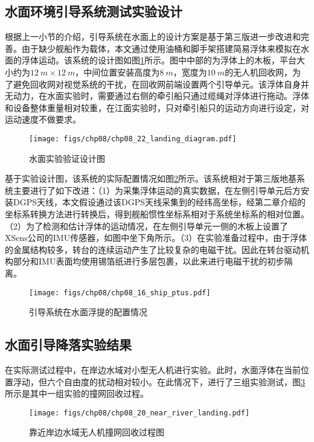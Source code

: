 \subsection{水面环境引导系统测试实验设计}
根据上一小节的介绍，引导系统在水面上的设计方案是基于第三版进一步改进和完善。由于缺少舰船作为载体，本文通过使用油桶和脚手架搭建简易浮体来模拟在水面的浮体运动。该系统的设计图如图\ref{fig:chp08_22_landing_diagram}所示。图中中部的为浮体上的木板，平台大小约为$12\ m\times 12\ m$，中间位置安装高度为$8\ m$，宽度为$10\ m$的无人机回收网，为了避免回收网对视觉系统的干扰，在回收网前端设置两个引导单元。该浮体自身并无动力，在水面实验时，需要通过右侧的牵引船只通过缆绳对浮体进行拖动。浮体和设备整体重量相对较重，在江面实验时，只对牵引船只的运动方向进行设定，对运动速度不做要求。

\begin{figure}[!th]
	\centering
	\texttt{[image: figs/chp08/chp08\_22\_landing\_diagram.pdf]}	
	\caption{水面实验验证设计图}
	\label{fig:chp08_22_landing_diagram}
\end{figure}

基于实验设计图，该系统的实际配置情况如图\ref{fig:chp08_16_ship_ptus}所示。该系统相对于第三版地基系统主要进行了如下改进：（1）为采集浮体运动的真实数据，在左侧引导单元后方安装DGPS天线，本文假设通过该DGPS天线采集到的经纬高坐标，经第二章介绍的坐标系转换方法进行转换后，得到舰船惯性坐标系相对于系统坐标系的相对位置。（2）为了检测和估计浮体的运动情况，在左侧引导单元一侧的木板上设置了XSens公司的IMU传感器，如图中坐下角所示。（3）在实验准备过程中，由于浮体的金属结构较多，转台的连续运动产生了比较复杂的电磁干扰。因此在转台驱动机构部分和IMU表面均使用锡箔纸进行多层包裹，以此来进行电磁干扰的初步隔离。

\begin{figure}[!ht]
	\centering
	\texttt{[image: figs/chp08/chp08\_16\_ship\_ptus.pdf]}	
	\caption{引导系统在水面浮提的配置情况}
	\label{fig:chp08_16_ship_ptus}
\end{figure}


\subsection{水面引导降落实验结果}
在实际测试过程中，在岸边水域对小型无人机进行实验。此时，水面浮体在当前位置浮动，但六个自由度的扰动相对较小。在此情况下，进行了三组实验测试，图\ref{fig:chp08_20_near_river_landing}所示是其中一组实验的撞网回收过程。

\begin{figure}[!th]
	\centering
	\texttt{[image: figs/chp08/chp08\_20\_near\_river\_landing.pdf]}	
	\caption{靠近岸边水域无人机撞网回收过程图}
	\label{fig:chp08_20_near_river_landing}
\end{figure}

